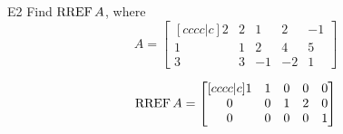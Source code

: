 \begin{problem}{E2}
Find \(\operatorname{RREF} A\), where
\[
  A =
  \begin{bmatrix}[cccc|c]
    2 & 2 & 1 & 2 & -1 \\
    1 & 1 & 2 & 4 & 5 \\
    3 & 3 & -1 & -2 & 1
  \end{bmatrix}
\]
\end{problem}
\begin{solution}
\[
  \operatorname{RREF} A =
  \begin{bmatrix}[cccc|c]
    1 & 1 & 0 & 0 & 0 \\
    0 & 0 & 1 & 2 & 0 \\
    0 & 0 & 0 & 0 & 1
  \end{bmatrix}
\]
\end{solution}

